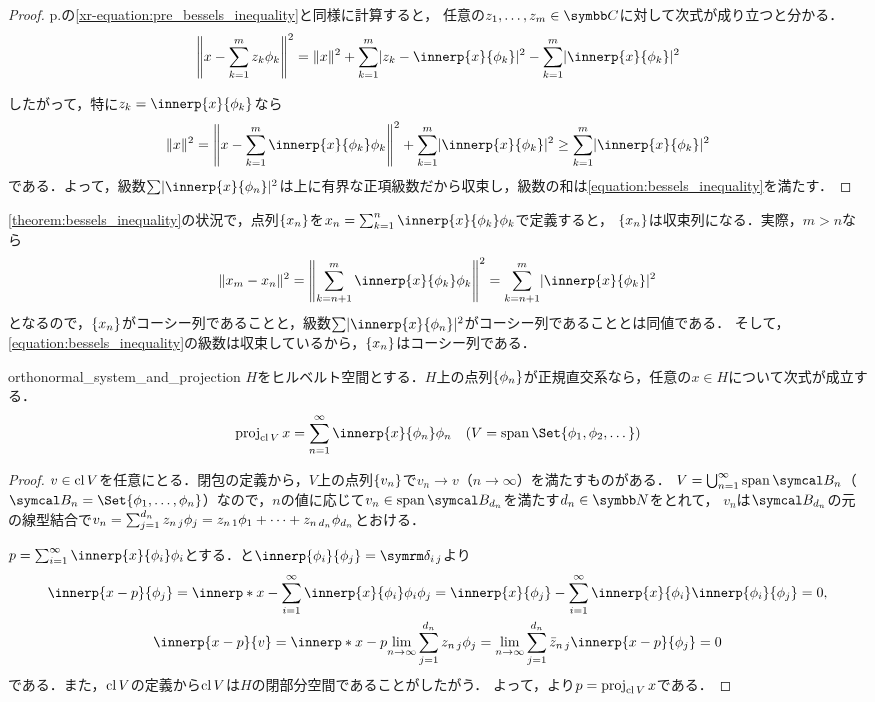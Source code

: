\documentclass[../../main]{subfiles}
\begin{document}
\begin{proof}
  p.\pageref{xr-equation:pre_bessels_inequality}の\cref{xr-equation:pre_bessels_inequality}と同様に計算すると，
  任意の\(z_1,\dots,z_m\in\numset{C}\)に対して次式が成り立つと分かる．
  \[
    \vnorm*{x-\sum_{k=1}^mz_k\phi_k}^2 = \vnorm{x}^2+\sum_{k=1}^m\abs{z_k-\innerp{x}{\phi_k}}^2-\sum_{k=1}^m\abs{\innerp{x}{\phi_k}}^2
  \]

  したがって，特に\(z_k=\innerp{x}{\phi_k}\)なら
  \[
    \vnorm{x}^2 = \vnorm*{x-\sum_{k=1}^m\innerp{x}{\phi_k}\phi_k}^2+\sum_{k=1}^m\abs{\innerp{x}{\phi_k}}^2
    \geq \sum_{k=1}^m\abs{\innerp{x}{\phi_k}}^2
  \]
  である．よって，級数\(\sum\abs{\innerp{x}{\phi_n}}^2\)は上に有界な正項級数だから収束し，級数の和は\cref{equation:bessels_inequality}を満たす．
\end{proof}

\cref{theorem:bessels_inequality}の状況で，点列\(\lbrace x_n\rbrace\)を\(x_n=\sum_{k=1}^n\innerp{x}{\phi_k}\phi_k\)で定義すると，
\(\lbrace x_n\rbrace\)は収束列になる．実際，\(m>n\)なら
\[
  \vnorm{x_m-x_n}^2 = \vnorm*{\sum_{k=n+1}^m\innerp{x}{\phi_k}\phi_k}^2
  = \sum_{k=n+1}^m\abs{\innerp{x}{\phi_k}}^2
\]
となるので，\(\lbrace x_n\rbrace\)がコーシー列であることと，級数\(\sum\abs{\innerp{x}{\phi_n}}^2\)がコーシー列であることとは同値である．
そして，\cref{equation:bessels_inequality}の級数は収束しているから，\(\lbrace x_n\rbrace\)はコーシー列である．

\begin{proposition}{}{orthonormal_system_and_projection}
  \(H\)をヒルベルト空間とする．\(H\)上の点列\(\lbrace\phi_n\rbrace\)が正規直交系なら，任意の\(x\in H\)について次式が成立する．
  \[
    \proj_{\clsr V}x = \sum_{n=1}^\infty\innerp{x}{\phi_n}\phi_n
    \quad(V=\spannedby\Set{\phi_1,\phi_2,\dotsc})
  \]
\end{proposition}

\begin{proof}
  \(v\in\operatorname{cl} V\)を任意にとる．閉包の定義から，\(V\)上の点列\(\lbrace v_n\rbrace\)で\(v_n\to v\)（\(n\to\infty\)）を満たすものがある．
  \(V=\bigcup_{n=1}^\infty\spannedby\basis{B}_n\)（\(\basis{B}_n=\Set{\phi_1,\dots,\phi_n}\)）なので，\(n\)の値に応じて\(v_n\in\spannedby\basis{B}_{d_n}\)を満たす\(d_n\in\numset{N}\)をとれて，
  \(v_n\)は\(\basis{B}_{d_n}\)の元の線型結合で\(v_n=\sum_{j=1}^{d_n}z_{n\,j}\phi_j=z_{n\,1}\phi_1+\dots+z_{n\,d_n}\phi_{d_n}\)とおける．

  \(p=\sum_{i=1}^\infty\innerp{x}{\phi_i}\phi_i\)とする．と\(\innerp{\phi_i}{\phi_j}=\kdelta{i}{j}\)より
  \begin{gather*}
    \innerp{x-p}{\phi_j} = \innerp*{x-\sum_{i=1}^\infty\innerp{x}{\phi_i}\phi_i}{\phi_j}
    = \innerp{x}{\phi_j}-\sum_{i=1}^\infty\innerp{x}{\phi_i}\innerp{\phi_i}{\phi_j}
    = 0, \\
    \innerp{x-p}{v} = \innerp*{x-p}{\lim_{n\to\infty}\sum_{j=1}^{d_n}\midx{z}{n}{j}\phi_j}
    = \lim_{n\to\infty}\sum_{j=1}^{d_n}\midx{\conj{z}}{n}{j}\innerp{x-p}{\phi_j}
    = 0
  \end{gather*}
  である．また，\(\operatorname{cl} V\)の定義から\(\operatorname{cl} V\)は\(H\)の閉部分空間であることがしたがう．
  よって，より\(p=\operatorname{proj}_{\operatorname{cl} V}x\)である．
\end{proof}
\end{document}
